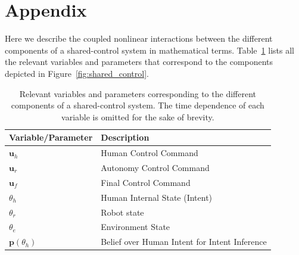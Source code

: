 \documentclass[letterpaper, 10 pt, conference]{ieeeconf}  %
\begin{document}
\section*{Appendix}\label{sec:appendix}
Here we describe the coupled nonlinear interactions between the different components of a shared-control system in mathematical terms. Table~\ref{tbl:vars} lists all the relevant variables and parameters that correspond to the components depicted in Figure~\ref{fig:shared_control}.
\begin{table}[t]
	\centering
	\caption{Relevant variables and parameters corresponding to the different components of a shared-control system. The time dependence of each variable is omitted for the sake of brevity.} 
	\begin{tabular}{|p{3cm}|p{3cm}|}
		\hline
		\textbf{Variable/Parameter} & \textbf{Description}  \\ \hline
		$\boldsymbol{u}_h$ & Human Control Command \\ \hline
		$\boldsymbol{u}_r$ & Autonomy Control Command \\ \hline
		$\boldsymbol{u}_f$ & Final Control Command \\ \hline
		$\theta_h$ & Human Internal State (Intent) \\ \hline
		$\theta_r$ & Robot state \\ \hline
		$\theta_e$ & Environment State \\ \hline
		$\boldsymbol{p}(\theta_h)$ & Belief over Human Intent for Intent Inference \\ \hline
		
	\end{tabular}
	\vspace{.2cm}
	
	\label{tbl:vars}
	\vspace{-.5cm}
\end{table} 
\end{document}

